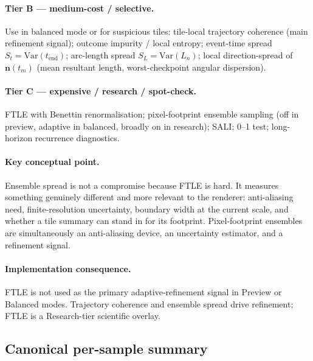 \documentclass[11pt]{report}
\begin{document}
\paragraph{Tier B --- medium-cost / selective.} Use in balanced mode or for suspicious tiles: tile-local trajectory coherence (main refinement signal); outcome impurity / local entropy; event-time spread $S_t=\mathrm{Var}(t_{\mathrm{end}})$; arc-length spread $S_L=\mathrm{Var}(L_n)$; local direction-spread of $\mathbf n(t_m)$ (mean resultant length, worst-checkpoint angular dispersion).

\paragraph{Tier C --- expensive / research / spot-check.} FTLE with Benettin renormalisation; pixel-footprint ensemble sampling (off in preview, adaptive in balanced, broadly on in research); SALI; 0--1 test; long-horizon recurrence diagnostics.

\paragraph{Key conceptual point.} Ensemble spread is not a compromise because FTLE is hard. It measures something genuinely different and more relevant to the renderer: anti-aliasing need, finite-resolution uncertainty, boundary width at the current scale, and whether a tile summary can stand in for its footprint. Pixel-footprint ensembles are simultaneously an anti-aliasing device, an uncertainty estimator, and a refinement signal.

\paragraph{Implementation consequence.} FTLE is not used as the primary adaptive-refinement signal in Preview or Balanced modes. Trajectory coherence and ensemble spread drive refinement; FTLE is a Research-tier scientific overlay.

\subsection{Canonical per-sample summary}
\end{document}
